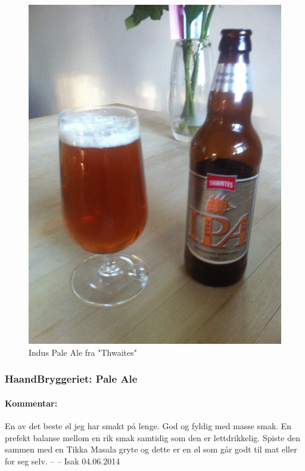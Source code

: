 \documentclass[12pt,a4paper,oneside,norsk]{article}
\begin{document}
\begin{figure} [H]
\centering
\includegraphics[scale=0.1, angle=270]{Bilder/Ol/ThwaitesIndusPaleAle.jpg}
\caption{Indus Pale Ale fra "Thwaites"}
\end{figure}

\newpage
\subsubsection{HaandBryggeriet: Pale Ale}
\paragraph{Kommentar:} En av det beste øl jeg har smakt på lenge. God og fyldig med masse smak. En prefekt balanse mellom en rik smak samtidig som den er lettdrikkelig. Spiste den sammen med en Tikka Masala gryte og dette er en øl som går godt til mat eller for seg selv.
\newline
-- -- Isak 04.06.2014
\end{document}
